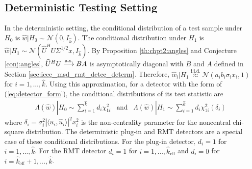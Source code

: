 \subsection{Deterministic Testing Setting}\label{sec:ieee_msd_roc_determ}
In the deterministic setting, the conditional distribution of a test sample under $H_0$ is $\widehat{w}|H_0\sim\mathcal{N}(0,I_{\widehat{k}})$. The conditional distribution under $H_1$ is $\widehat{w}|H_1\sim\mathcal{N}(\widehat{U}^HU\Sigma^{1/2} x,I_{\widehat{k}})$. By Proposition \ref{th:chpt2:angles} and Conjecture \ref{conj:angles}, $\widehat{U}^HU\overset{\textrm{a.s.}}{\longrightarrow} BA$ is asymptotically diagonal with $B$ and $A$ defined in Section \ref{sec:ieee_msd_rmt_detec_determ}. Therefore, $\widehat{w}_i|H_1\overset{\text{i.i.d.}}{\approx}\mathcal{N}(a_ib_i\sigma_ix_i,1)$ for $i=1,\dots,\widehat{k}$. Using this approximation, for a detector with the form of (\ref{eq:detector_form}), the conditional distributions of its test statistic are
\begin{equation}\label{eq:determ_stat_distr}
\begin{aligned}
&\Lambda(\widehat{w})|H_0 \sim \sum_{i=1}^{\widehat{k}} d_i\chi_{1i}^2 \,\,\,\text{ and }\,\,\, \Lambda(\widehat{w})|H_1\sim\sum_{i=1}^{\widehat{k}}d_i\chi_{1i}^2(\delta_i)
\end{aligned}
\end{equation}
where $\delta_i=\sigma_i^2|\langle u_i,\widehat{u}_i\rangle|^2x_i^2$ is the non-centrality parameter for the noncentral chi-square distribution. The deterministic plug-in and RMT detectors are a special case of these conditional distributions. For the plug-in detector, $d_i=1$ for $i=1,\dots,\widehat{k}$. For the RMT detector $d_i=1$ for $i=1,\dots,\widehat{k}_{\text{eff}}$ and $d_i=0$ for $i=\widehat{k}_{\text{eff}}+1,\dots,\widehat{k}$.

